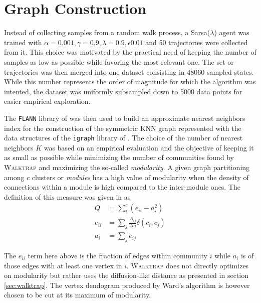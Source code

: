 \documentclass[12pt, oneside, extrafontsizes]{memoir}  %
\theoremstyle{plain}
\theoremstyle{definition}
\begin{document}
\section{Graph Construction}

Instead of collecting samples from a random walk process, a Sarsa($\lambda$) agent was trained with $\alpha = 0.001, \gamma = 0.9, \lambda = 0.9, \epsilon 0.01$ and 50 trajectories were collected from it. This choice was motivated by the practical need of keeping the number of samples as low as possible while favoring the most relevant one. The set or trajectories was then merged into one dataset consisting in 48060 sampled states. While this number represents the order of magnitude for which the algorithm was intented, the dataset was uniformly subsampled down to 5000 data points for easier empirical exploration. 

The \texttt{FLANN} library of \cite{Muja2009} was then used to build an approximate nearest neighbors index for the construction of the symmetric KNN graph represented with the data structures of the \texttt{igraph} library of \cite{Csardi2006}. The choice of the number of nearest neighbors $K$ was based on an empirical evaluation and the objective of keeping it as small as possible while minimizing the number of communities found by \textsc{Walktrap} and maximizing the so-called \textit{modularity}. A given graph partitioning among $c$ clusters or \textit{modules} has a high value of modularity when the density of connections within a module is high compared to the inter-module ones. The definition of this measure was given in \cite{Newman2006} as
\begin{align}
Q &= \sum_{i}^c \left( e_{ii} - a_i^2 \right) \\
e_{ii} &= \sum_j 	\frac{A_{ij}}{2m} \delta(c_i, c_j) \\
a_i &= \sum_j e_{ij}
\end{align}

The $e_{ii}$ term here above is the fraction of edges within community $i$ while $a_i$ is of those edges with at least one vertex in $i$. \textsc{Walktrap} does not directly optimizes on modularity but rather uses the diffusion-like distance as presented in section \ref{sec:walktrap}.
The vertex dendogram produced by Ward's algorithm is however chosen to be cut at its maximum of modularity. 
\end{document}
